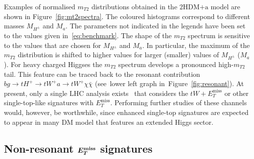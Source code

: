 \documentclass[a4paper, 11pt,notoc]{article}
\newcommand{\MET}{\ensuremath{E_T^\mathrm{miss}}\xspace}
\newcommand{\ma}{\ensuremath{M_{a}}\xspace}
\newcommand{\mHc}{\ensuremath{M_{H^{\pm}}}\xspace}
\newcommand{\hdma}{\ensuremath{\textrm{2HDM+a}}\xspace}
\def\bm#1{\mbox{\boldmath$#1$\unboldmath}}
\begin{document}
Examples of normalised $m_{T2}$ distributions obtained in the \hdma model are shown in Figure~\ref{fig:mt2spectra}. The coloured histograms correspond to different masses $\mHc$ and $\ma$. The parameters not indicated in the legends have been set to the values given in~\eqref{eq:benchmark}. The shape of the $m_{T2}$ spectrum is sensitive to the values that are chosen for $\mHc$ and $\ma$. In particular, the maximum of the $m_{T2}$ distribution is shifted to higher values for larger (smaller) values of $\mHc$ ($\ma$). For heavy charged Higgses the $m_{T2}$ spectrum develops a pronounced high-$m_{T2}$ tail.  This feature can be traced back to the resonant contribution $b g \to t H^+  \to  t W^+ a  \to t W^+ \chi \bar \chi$ (see~lower left graph in~Figure~\ref{fig:resonant}).  At present, only a single LHC analysis exists~\cite{CMS-PAS-EXO-18-010}  that considers the $tW + \MET$  or other single-top-like signatures with $\MET$. Performing further studies of these channels would, however, be worthwhile, since enhanced single-top signatures are expected to appear in many DM model that features an extended Higgs sector. 

\subsection[Non-resonant $E_T^{\rm miss}$ signatures]{Non-resonant $\bm{E_T^{\rm miss}}$ signatures}
\label{sec:nonresonant}
\end{document}
